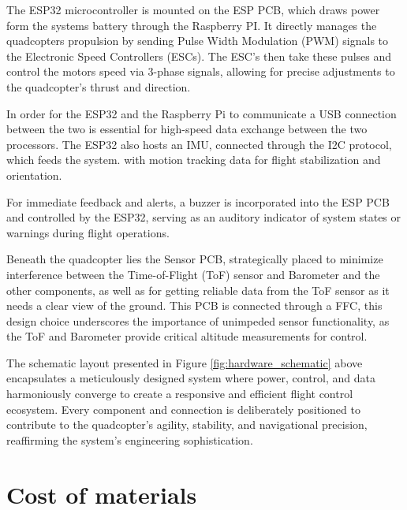 \documentclass{report}
\begin{document}
The ESP32 microcontroller is mounted on the ESP PCB, which draws power form the
systems battery through the Raspberry PI. It directly manages the quadcopters
propulsion by sending Pulse Width Modulation (PWM) signals to the Electronic
Speed Controllers (ESCs). The ESC’s then take these pulses and control the
motors speed via 3-phase signals, allowing for precise adjustments to the
quadcopter's thrust and direction.

In order for the ESP32 and the Raspberry Pi to communicate a USB connection
between the two is essential for high-speed data exchange between the two
processors. The ESP32 also hosts an IMU, connected through the I2C protocol,
which feeds the system. with motion tracking data for flight stabilization and
orientation.

For immediate feedback and alerts, a buzzer is incorporated into the ESP PCB and
controlled by the ESP32, serving as an auditory indicator of system states or
warnings during flight operations.

Beneath the quadcopter lies the Sensor PCB, strategically placed to minimize
interference between the Time-of-Flight (ToF) sensor and Barometer and the other
components, as well as for getting reliable data from the ToF sensor as it needs
a clear view of the ground. This PCB is connected through a FFC, this design
choice underscores the importance of unimpeded sensor functionality, as the ToF
and Barometer provide critical altitude measurements for control.

The schematic layout presented in Figure \ref{fig:hardware_schematic}  above
encapsulates a meticulously designed system where power, control, and data
harmoniously converge to create a responsive and efficient flight control
ecosystem. Every component and connection is deliberately positioned to
contribute to the quadcopter’s agility, stability, and navigational precision,
reaffirming the system’s engineering sophistication.

\section{Cost of materials}
\end{document}
